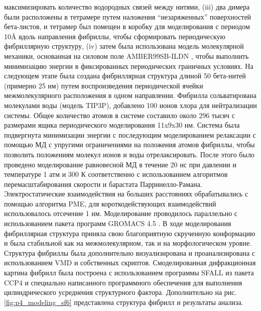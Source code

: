 максимизировать количество водородных связей между нитями, (iii) два димера были расположены в тетрамере путем наложения ``незаряженных'' поверхностей бета-листов, и тетрамер был помещен в коробку для моделирования с периодом 10\AA{} вдоль направления фибриллы, чтобы сформировать периодическую фибриллярную структуру, (iv) затем была использована модель молекулярной механики, основанная на силовом поле AMBER99SB-ILDN \cite{lindorff-larsen_improved_2010}, чтобы выполнить минимизацию энергии в фиксированных периодических граничных условиях. На следующем этапе была создана фибриллярная структура длиной 50 бета-нитей (примерно 25 нм) путем воспроизведения периодической ячейки межмолекулярного расположения в одном направлении. Фибрилла сольватирована молекулами воды (модель TIP3P), добавлено 100 ионов хлора для нейтрализации системы. Общее количество атомов в системе составило около 296 тысяч с размерами ящика периодического моделирования 11x9x30 нм. Система была подвергнута минимизации энергии с последующим моделированием релаксации с помощью МД с упругими ограничениями на положения атомов фибриллы, чтобы позволить положениям молекул ионов и воды отрелаксировать. После этого было проведено моделирование равновесной МД в течение 20 нс при давлении и температуре 1 атм и 300 К соответственно с использованием алгоритмов перемасштабирования скорости и барастата Парринелло-Рамана. Электростатические взаимодействия на больших расстояниях обрабатывались с помощью алгоритма PME, для короткодействующих взаимодействий использовалось отсечение 1 нм. Моделирование проводилось параллельно с использованием пакета программ GROMACS 4.5 \cite{van_der_spoel_gromacs_2005}. В ходе моделирования фибриллярная структура приняла свою благоприятную скрученную конформацию и была стабильной как на межмолекулярном, так и на морфологическом уровне. Структура фибриллы была дополнительно визуализирована и проанализирована с использованием VMD \cite{humphrey_vmd_1996} и собственных скриптов. Смоделированная дифракционная картина фибрилл была построена с использованием программы SFALL из пакета CCP4 \cite{winn_overview_2011} и специально написанного программного обеспечения для выполнения цилиндрического усреднения структурного фактора. Дополнительно на рис. \ref{fig:p4_modeling_sf6} представлена структура фибрилл и результаты анализа.




